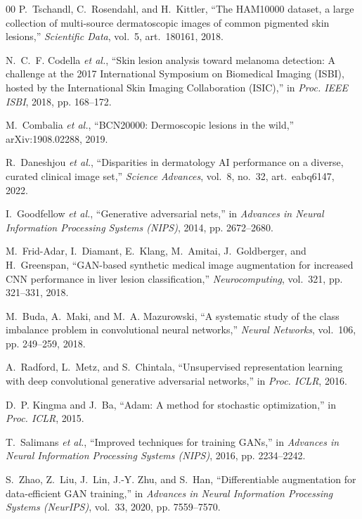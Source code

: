 \documentclass[conference]{IEEEtran}
\begin{document}
\begin{thebibliography}{00}
P.~Tschandl, C.~Rosendahl, and H.~Kittler, ``The HAM10000 dataset, a large collection of multi-source dermatoscopic images of common pigmented skin lesions,'' \emph{Scientific Data}, vol.~5, art.~180161, 2018.

N.~C.~F. Codella \emph{et al.}, ``Skin lesion analysis toward melanoma detection: A challenge at the 2017 International Symposium on Biomedical Imaging (ISBI), hosted by the International Skin Imaging Collaboration (ISIC),'' in \emph{Proc. IEEE ISBI}, 2018, pp. 168--172.

M.~Combalia \emph{et al.}, ``BCN20000: Dermoscopic lesions in the wild,'' arXiv:1908.02288, 2019.

R.~Daneshjou \emph{et al.}, ``Disparities in dermatology AI performance on a diverse, curated clinical image set,'' \emph{Science Advances}, vol.~8, no.~32, art.~eabq6147, 2022.

I.~Goodfellow \emph{et al.}, ``Generative adversarial nets,'' in \emph{Advances in Neural Information Processing Systems (NIPS)}, 2014, pp. 2672--2680.

M.~Frid-Adar, I.~Diamant, E.~Klang, M.~Amitai, J.~Goldberger, and H.~Greenspan, ``GAN-based synthetic medical image augmentation for increased CNN performance in liver lesion classification,'' \emph{Neurocomputing}, vol.~321, pp. 321--331, 2018.

M.~Buda, A.~Maki, and M.~A. Mazurowski, ``A systematic study of the class imbalance problem in convolutional neural networks,'' \emph{Neural Networks}, vol.~106, pp. 249--259, 2018.

A.~Radford, L.~Metz, and S.~Chintala, ``Unsupervised representation learning with deep convolutional generative adversarial networks,'' in \emph{Proc. ICLR}, 2016.

D.~P. Kingma and J.~Ba, ``Adam: A method for stochastic optimization,'' in \emph{Proc. ICLR}, 2015.

T.~Salimans \emph{et al.}, ``Improved techniques for training GANs,'' in \emph{Advances in Neural Information Processing Systems (NIPS)}, 2016, pp. 2234--2242.

S.~Zhao, Z.~Liu, J.~Lin, J.-Y. Zhu, and S.~Han, ``Differentiable augmentation for data-efficient GAN training,'' in \emph{Advances in Neural Information Processing Systems (NeurIPS)}, vol.~33, 2020, pp. 7559--7570.


\end{thebibliography}
\end{document}
